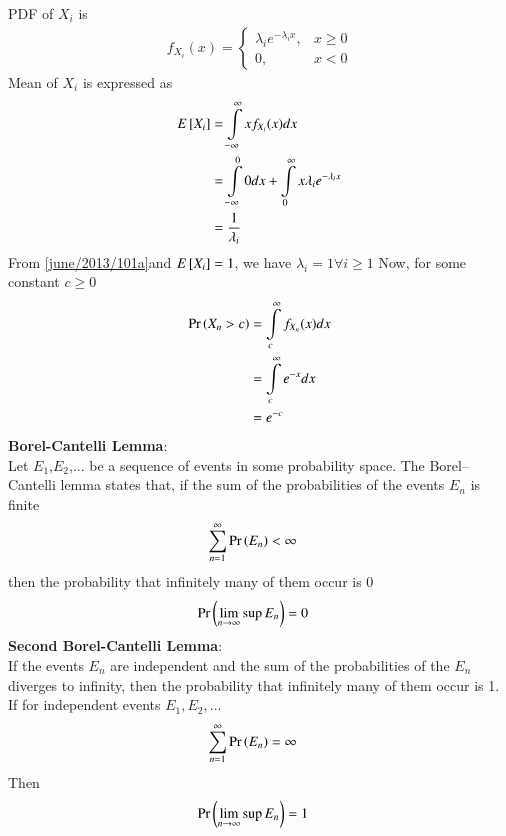 \newcommand{\Integral}[2]{\ensuremath{\int\limits_{#1}^{#2}}}
PDF of $X_i$ is
\begin{align}
    f_{X_i}(x)=\begin{cases}\lambda_i e^{-\lambda_i x}, &x\geq 0\\
                0, &x<0\nonumber
    \end{cases}    
\end{align} 
Mean of $X_i$ is expressed as
\begin{align}
    \mean{X_i}&=\Integral{-\infty}{\infty}x f_{X_i}(x) dx\nonumber\\
              &=\Integral{-\infty}{0}0 dx + \Integral{0}{\infty}x \lambda_i e^{-\lambda_i x}\nonumber\\
              &=\frac{1}{\lambda_i}\label{june/2013/101a}
\end{align}
From \eqref{june/2013/101a}and $E\left[ X_i \right]=1$, we have $\lambda_i=1 \forall  i \geq1$
Now, for some constant $c\geq0$
\begin{align}
    \pr{X_n>c}&=\Integral{c}{\infty}f_{X_n}(x)dx\nonumber\\
              &=\Integral{c}{\infty}e^{-x}dx\nonumber\\
              &=e^{-c}\label{june/2013/101b}
\end{align}
\textbf{Borel-Cantelli Lemma}:\\
Let $E_1$,$E_2$,... be a sequence of events in some probability space. The Borel–Cantelli lemma states that, if the sum of the probabilities of the events $E_n$ is finite
\begin{align}
    \sum_{n=1}^{\infty}\Pr\left(E_n\right)&<\infty
\end{align}
then the probability that infinitely many of them occur is 0
\begin{align}
    \Pr\left(\lim_{n \rightarrow \infty}\sup E_n\right)&=0
\end{align}
\textbf{Second Borel-Cantelli Lemma}:\\
If the events $E_n$ are independent and the sum of the probabilities of the $E_n$ diverges to infinity, then the probability that infinitely many of them occur is 1.
If for independent events $E_1,E_2,...$
\begin{align}
    \sum_{n=1}^{\infty}\Pr\left(E_n\right)&=\infty
\end{align}
Then
\begin{align}
    \Pr\left(\lim_{n \rightarrow \infty}\sup E_n\right)&=1
\end{align}
